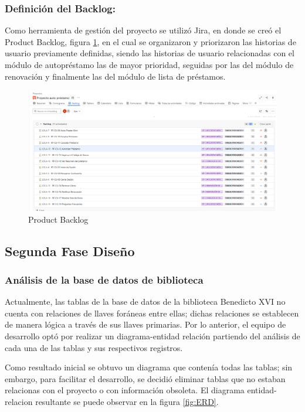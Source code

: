 \documentclass[spanish]{ieee_upb}
\begin{document}
\subsubsection{Definición del Backlog:}
Como herramienta de gestión del proyecto se utilizó Jira, en donde se creó el Product Backlog, figura \ref{fig:backlog}, en el cual se organizaron y priorizaron las historias de usuario previamente definidas, siendo las historias de usuario relacionadas con el módulo de autopréstamo las de mayor prioridad, seguidas por las del módulo de renovación y finalmente las del módulo de lista de préstamos.

\begin{figure}[H]
    \centering
    \includegraphics[width=1\linewidth]{img/productBacklog.png}
    \caption[Product Backlog]{Product Backlog}
    \label{fig:backlog}
\end{figure}

\subsection{Segunda Fase Diseño}

\subsubsection{Análisis de la base de datos de biblioteca}
Actualmente, las tablas de la base de datos de la biblioteca Benedicto XVI no cuenta con relaciones de llaves foráneas entre ellas; dichas relaciones se establecen de manera lógica a través de sus llaves primarias.  Por lo anterior, el equipo de desarrollo optó por realizar un diagrama-entidad relación partiendo del análisis de cada una de las tablas y sus respectivos registros.
\vspace{0.3 cm}

Como resultado inicial se obtuvo un diagrama que contenía todas las tablas; sin embargo, para facilitar el desarrollo, se decidió eliminar tablas que no estaban relacionas con el proyecto o con información obsoleta. El diagrama entidad-relacion resultante se puede observar en la figura \ref{fig:ERD}.
\end{document}

